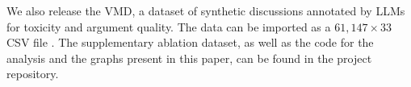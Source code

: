 %

We also release the \ac{VMD}, a dataset of synthetic discussions annotated by \acp{LLM} for toxicity and argument quality. The data can be imported as a $61,147 \times 33$ CSV file \datasetlink. The supplementary ablation dataset, as well as the code for the analysis and the graphs present in this paper, can be found in the project repository\analysislink.